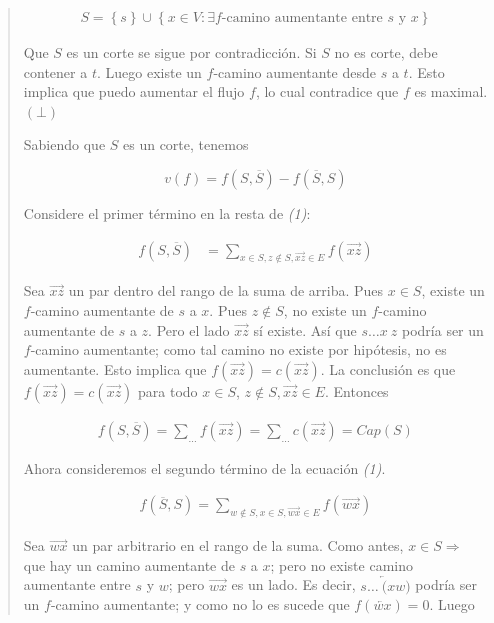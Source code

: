 \documentclass[a4paper]{article}
\begin{document}
\begin{quote}
\begin{align*}
    S = \left\{ s \right\} \cup \left\{ x \in V : \exists f\text{-camino
    aumentante entre $s$ y $x$} \right\} 
\end{align*}

Que $S$ es un corte se sigue por contradicción. Si $S$ no es corte, debe
contener a $t$. Luego existe un $f$-camino aumentante desde $s$ a $t$. Esto
implica que puedo aumentar el flujo $f$, lo cual contradice que $f$ es maximal.
$(\bot)$

Sabiendo que $S$ es un corte, tenemos 

\begin{equation}
    v(f) = f(S, \overline{S}) - f(\overline{S}, S)
\end{equation}

Considere el primer término en la resta de \textit{(1)}:

\begin{align*}
    f(S, \overline{S}) &= \sum_{x \in S, z \not\in S, \overrightarrow{xz} \in E}
    f(\overrightarrow{xz})
\end{align*}

Sea $\overrightarrow{xz}$ un par dentro del rango de la suma de arriba. Pues $x
\in S$, existe un $f$-camino aumentante de $s$ a $x$. Pues $z \not\in S$, no
existe un $f$-camino aumentante de $s$ a $z$. Pero el lado $\overrightarrow{xz}$
sí existe. Así que $s \ldots x ~ z$ podría ser un $f$-camino aumentante; como
tal camino no existe por hipótesis, no es aumentante. Esto implica que
$f(\overrightarrow{xz}) = c(\overrightarrow{xz})$. La conclusión es que
$f(\overrightarrow{xz}) = c(\overrightarrow{xz})$ para todo $x \in S$, $z
\not\in S, \overrightarrow{xz}\in E$. Entonces 

\begin{align*}
    f(S, \overline{S}) = \sum_{\ldots} f(\overrightarrow{xz}) = \sum_{\ldots}
    c(\overrightarrow{xz}) = Cap(S)
\end{align*}

Ahora consideremos el segundo término de la ecuación \textit{(1)}. 

\begin{align*}
    f(\overline{S}, S) = \sum_{w \not\in S, x \in S, \overrightarrow{wx} \in E}
    f(\overrightarrow{wx})
\end{align*}

Sea $\overrightarrow{wx}$ un par arbitrario en el rango de la suma. Como antes,
$x \in S \Rightarrow$ que hay un camino aumentante de $s$ a $x$; pero no existe
camino aumentante entre $s$ y $w$; pero $\overrightarrow{wx}$ es un lado. Es
decir, $s \ldots ~ \overleftarrow(xw)$ podría ser un $f$-camino aumentante; y
como no lo es sucede que $f(\overleftarrow{wx}) = 0$. Luego 


\end{quote}
\end{document}
